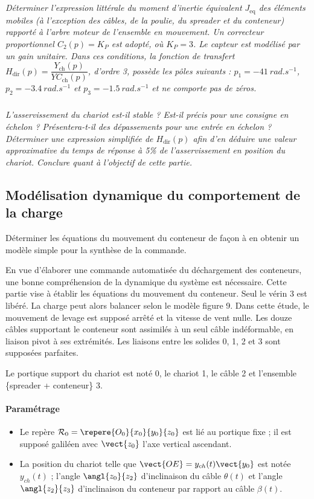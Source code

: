 \documentclass[10pt,fleqn]{article} %
\begin{document}
\subparagraph{\label{q11}}\textit{Déterminer l’expression littérale du moment d’inertie équivalent $J_{\text{eq}}$ des éléments mobiles (à l’exception
des câbles, de la poulie, du spreader et du conteneur) rapporté à l’arbre moteur de l’ensemble en mouvement.
Un correcteur proportionnel $C_2(p) = K_P$ est adopté, où $K_P = 3$. Le capteur est modélisé par un gain unitaire.
Dans ces conditions, la fonction de transfert 
$H_{\text{dir}}(p) = \dfrac{Y_{\text{ch}}(p)}{Y C_{\text{ch}}(p)}$, d’ordre 3, possède les pôles suivants : 
$p_1 = -\SI{41}{rad.s^{-1}}$, 
$p_2 = -\SI{3,4}{rad.s^{-1}}$ et 
$p_3 = -\SI{1,5}{rad.s^{-1}}$ et ne comporte pas de zéros.}

\subparagraph{\label{q12}}\textit{L’asservissement du chariot est-il stable ? Est-il précis pour une consigne en échelon ? Présentera-t-il des
dépassements pour une entrée en échelon ? Déterminer une expression simplifiée de $H_{\text{dir}}(p)$ afin d’en déduire
une valeur approximative du temps de réponse à 5\% de l’asservissement en position du chariot. Conclure quant
à l’objectif de cette partie.}

\subsection{Modélisation dynamique du comportement de la charge}
\begin{obj}
Déterminer les équations du mouvement du conteneur de façon à en obtenir un modèle simple pour
la synthèse de la commande.
\end{obj}


En vue d’élaborer une commande automatisée du déchargement des conteneurs, une bonne compréhension de
la dynamique du système est nécessaire. Cette partie vise à établir les équations du mouvement du conteneur.
Seul le vérin 3 est libéré. La charge peut alors balancer selon le modèle figure 9. Dans cette étude, le mouvement
de levage est supposé arrêté et la vitesse de vent nulle. Les douze câbles supportant le conteneur sont assimilés
à un seul câble indéformable, en liaison pivot à ses extrémités. Les liaisons entre les solides 0, 1, 2 et 3 sont
supposées parfaites.

Le portique support du chariot est noté 0, le chariot 1, le câble 2 et l’ensemble \{spreader + conteneur\} 3.

\paragraph*{Paramétrage}
\begin{itemize}
\item Le repère $\mathcal{R}_0=\repere{O_0}{x_0}{y_0}{z_0}$ est lié au portique fixe ; il est supposé
galiléen avec $\vect{z_0}$ l’axe vertical ascendant.
\item La position du chariot telle que $\vect{OE} = y_{ch}(t) \vect{y_0}$ est notée $y_{ch}(t)$ ;
l’angle $\angl{z_0}{z_2}$ d’inclinaison du câble $\theta(t)$ et l’angle $\angl{z_2}{z_3}$ d’inclinaison
du conteneur par rapport au câble  $\beta(t)$.
\end{itemize}
\end{document}
